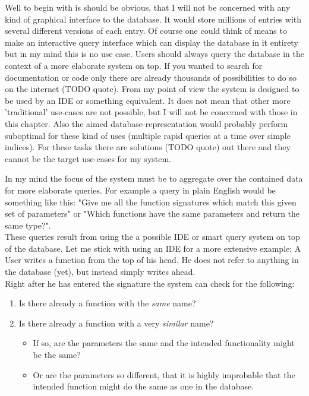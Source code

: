 \documentclass[12p]{scrartcl}
\begin{document}
Well to begin with is should be obvious, that I will not be concerned with any kind of graphical interface to the database. It would store millions of entries with several different versions of each entry. Of course one could think of means to make an interactive query interface which can display the database in it entirety but in my mind this is no use case. Users should always query the database in the context of a more elaborate system on top. If you wanted to search for documentation or code only there are already thousands of possibilities to do so on the internet (TODO quote).
From my point of view the system is designed to be used by an IDE or something equivalent. It does not mean that other more 'traditional' use-cases are not possible, but I will not be concerned with those in this chapter. Also the aimed database-representation would probably perform suboptimal for these kind of uses (multiple rapid queries at a time over simple indices). For these tasks there are solutions (TODO quote) out there and they cannot be the target use-cases for my system.

In my mind the focus of the system must be to aggregate over the contained data for more elaborate queries. For example a query in plain English would be something like this: "Give me all the function signatures which match this given set of parameters" or "Which functions have the same parameters and return the same type?".\\
These queries result from using the a possible IDE or smart query system on top of the database. Let me stick with using an IDE for a more extensive example: A User writes a function from the top of his head. He does not refer to anything in the database (yet), but instead simply writes ahead. \\
Right after he has entered the signature the system can check for the following: 
\begin{enumerate}
	\item Is there already a function with the \textit{same} name?
	\item Is there already a function with a very \textit{similar} name?
	\begin{itemize}
		\item If so, are the parameters the same and the intended functionality might be the same?
		\item Or are the parameters so different, that it is highly improbable that the intended function might do the same as one in the database.
	\end{itemize}
\end{enumerate}
\end{document}
